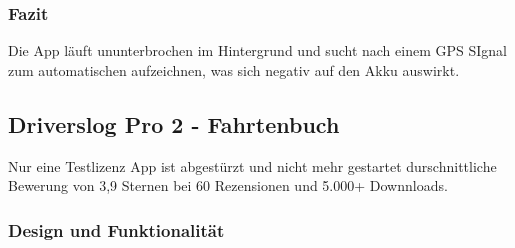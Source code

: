 \documentclass[a4paper]{article}
\begin{document}
\subsubsection{Fazit}
Die App läuft ununterbrochen im Hintergrund und sucht nach einem GPS SIgnal zum automatischen aufzeichnen,
was sich negativ auf den Akku auswirkt.

\subsection{Driverslog Pro 2 - Fahrtenbuch}
Nur eine Testlizenz
App ist abgestürzt und nicht mehr gestartet
durschnittliche Bewerung von 3,9 Sternen bei 60 Rezensionen und 5.000+ Downnloads.

\subsubsection{Design und Funktionalität}
\end{document}
